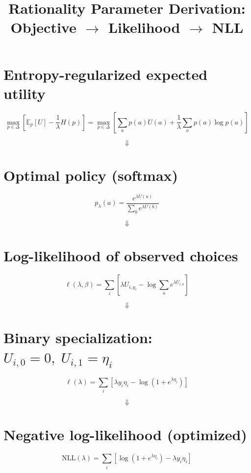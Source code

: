 \documentclass[11pt]{article}
\title{Rationality Parameter Derivation: Objective $\to$ Likelihood $\to$ NLL}
\author{}
\date{}
\begin{document}
\maketitle

\section{Entropy-regularized expected utility}

\[
\max_{p \in \Delta}
\left[
\mathbb{E}_p[U]
-
\frac{1}{\lambda} H(p)
\right]
=
\max_{p \in \Delta}
\left[
\sum_a p(a)U(a)
+
\frac{1}{\lambda}\sum_a p(a)\log p(a)
\right]
\]

\[
\Downarrow
\]

\section{Optimal policy (softmax)}

\[
p_\lambda(a)
=
\frac{e^{\lambda U(a)}}{\sum_b e^{\lambda U(b)}}
\]

\[
\Downarrow
\]

\section{Log-likelihood of observed choices}

\[
\ell(\lambda,\beta)
=
\sum_i
\left[
\lambda U_{i,y_i}
-
\log\sum_a e^{\lambda U_{i,a}}
\right]
\]

\[
\Downarrow
\]

\section{Binary specialization: $U_{i,0}=0,\;U_{i,1}=\eta_i$}

\[
\ell(\lambda)
=
\sum_i
\left[
\lambda y_i \eta_i
-
\log\left(1+e^{\lambda \eta_i}\right)
\right]
\]

\[
\Downarrow
\]

\section{Negative log-likelihood (optimized)}

\[
\mathrm{NLL}(\lambda)
=
\sum_i
\left[
\log\left(1+e^{\lambda \eta_i}\right)
-
\lambda y_i \eta_i
\right]
\]
\end{document}
